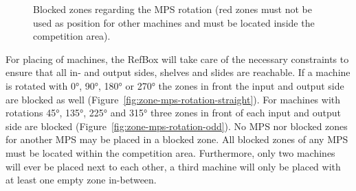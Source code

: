 \documentclass[12pt,twoside]{article}
\newcommand{\reffig}[1]{Figure~\ref{#1}}
\begin{document}
\begin{figure}[t!]
    \centering
    \quad
    \caption{
      Blocked zones regarding the MPS rotation (red zones must not be used as
      position for other machines and must be located inside the competition
      area).
    }
    \label{fig:zone-mps-blocked}
\end{figure}
For placing of machines, the RefBox will take care of the necessary
constraints to ensure that all in- and output sides, shelves and
slides are reachable.  If a machine is rotated with \ang{0}, \ang{90},
\ang{180} or \ang{270} the zones in front the input and output side
are blocked as well (\reffig{fig:zone-mps-rotation-straight}).  For
machines with rotations \ang{45}, \ang{135}, \ang{225} and \ang{315}
three zones in front of each input and output side are blocked
(\reffig{fig:zone-mps-rotation-odd}). No MPS nor blocked zones for another MPS
may be placed in a blocked zone. All blocked zones of any MPS must be located
within the competition area. Furthermore, only two machines will ever be placed
next to each other, a third machine will only be placed with at least one empty
zone in-between.
\end{document}
